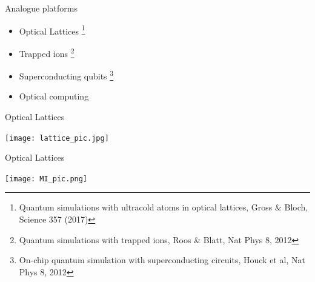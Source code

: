 \documentclass[10pt]{beamer}
\begin{document}
\begin{frame}{Analogue platforms}
    \begin{itemize}
        \item Optical Lattices \footnote{Quantum simulations with ultracold atoms in optical lattices, Gross \& Bloch, Science 357 (2017)}
        \item Trapped ions \footnote{Quantum simulations with trapped ions, Roos \& Blatt, Nat Phys 8, 2012}
        \item Superconducting qubits \footnote{On-chip quantum simulation with superconducting circuits, Houck et al, Nat Phys 8, 2012}
        \item Optical computing 
    \end{itemize}
\end{frame}

\begin{frame}{Optical Lattices}
    
    \texttt{[image: lattice\_pic.jpg]}
    


    
\end{frame}

\begin{frame}{Optical Lattices}
 
\texttt{[image: MI\_pic.png]}
    

\end{frame}
\end{document}
